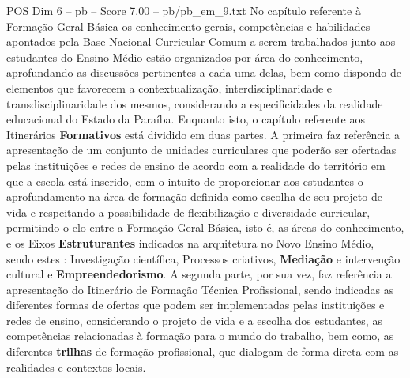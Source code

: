\begin{textsample}{POS Dim 6 – pb – Score 7.00 – pb/pb\_em\_9.txt}
No capítulo referente à Formação Geral Básica os conhecimento gerais, competências e habilidades apontados pela Base Nacional Curricular Comum a serem trabalhados junto aos estudantes do Ensino Médio estão organizados por área do conhecimento, aprofundando as discussões pertinentes a cada uma delas, bem como dispondo de elementos que favorecem a contextualização, interdisciplinaridade e transdisciplinaridade dos mesmos, considerando a especificidades da realidade educacional do Estado da Paraíba.
Enquanto isto, o capítulo referente aos Itinerários \textbf{Formativos} está dividido em duas partes.
A primeira faz referência a apresentação de um conjunto de unidades curriculares que poderão ser ofertadas pelas instituições e redes de ensino de acordo com a realidade do território em que a escola está inserido, com o intuito de proporcionar aos estudantes o aprofundamento na área de formação definida como escolha de seu projeto de vida e respeitando a possibilidade de flexibilização e diversidade curricular, permitindo o elo entre a Formação Geral Básica, isto é, as áreas do conhecimento, e os Eixos \textbf{Estruturantes} indicados na arquitetura no Novo Ensino Médio, sendo estes : Investigação científica, Processos criativos, \textbf{Mediação} e intervenção cultural e \textbf{Empreendedorismo}.
A segunda parte, por sua vez, faz referência a apresentação do Itinerário de Formação Técnica Profissional, sendo indicadas as diferentes formas de ofertas que podem ser implementadas pelas instituições e redes de ensino, considerando o projeto de vida e a escolha dos estudantes, as competências relacionadas à formação para o mundo do trabalho, bem como, as diferentes \textbf{trilhas} de formação profissional, que dialogam de forma direta com as realidades e contextos locais.

\end{textsample}
